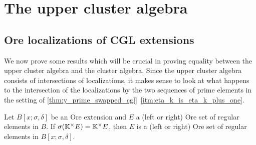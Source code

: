 \section{The upper cluster algebra}
\subsection{Ore localizations of CGL extensions}
We now prove some results which will be crucial in proving equality between the upper
cluster algebra and the cluster algebra. Since the upper cluster algebra consists of
intersections of localizations, it makes sense to look at what happens to the
intersection of the localizations by the two sequences of prime elements in the setting
of \cref{thm:y_prime_swapped_cgl}~\ref*{itm:eta_k_is_eta_k_plus_one}.

\begin{lemma}\label{lem:ore_set_ore_extension}
	Let $B[x;\sigma,\delta]$ be an Ore extension and $E$ a (left or right) Ore set of
	regular elements in $B$. If $\sigma(\mathbb{K}^\times E) = \mathbb{K}^\times E$, then $E$ is a
	(left or right) Ore set of regular elements in $B[x;\sigma, \delta]$.
\end{lemma}
